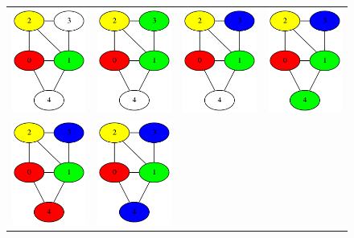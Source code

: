 \documentclass{article}
\theoremstyle{definition}
\theoremstyle{remark}
\begin{document}
\begin{figure}
\begin{minipage}{1\textwidth}
\begin{tabular}{cccc}
            \includegraphics[width=3cm]{examples/3/example3_4.png} &
            \includegraphics[width=3cm]{examples/3/example3_5.png} &
            \includegraphics[width=3cm]{examples/3/example3_6.png} &
            \includegraphics[width=3cm]{examples/3/example3_7.png} \\
            \includegraphics[width=3cm]{examples/3/example3_8.png} &
            \includegraphics[width=3cm]{examples/3/example3_9.png} 

\end{tabular}
\end{minipage}
\end{figure}
\end{document}
